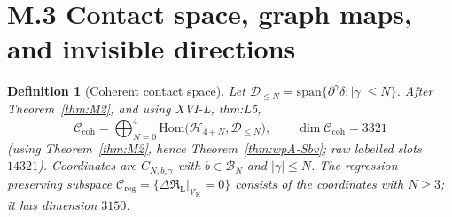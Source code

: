 \documentclass{article}
\newtheorem{definition}[proposition]{Definition}
\theoremstyle{remark}
\newcommand{\RL}{\mathfrak R_{\mathrm L}}
\newcommand{\Ccoh}{\mathcal C_{\mathrm{coh}}}
\newcommand{\Creg}{\mathcal C_{\mathrm{reg}}}
\begin{document}
\section{M.3 Contact space, graph maps, and invisible directions}
\label{sec:m3}

\begin{definition}[Coherent contact space]
\label{def:Ccoh}
Let $\mathcal D_{\le N}=\mathrm{span}\{\partial^\gamma\delta:|\gamma|\le N\}$.
After Theorem~\ref{thm:M2}, and using XVI-L, thm:L5,
\[
\Ccoh=\bigoplus_{N=0}^4\mathrm{Hom}\bigl(\mathcal H_{4+N},\mathcal D_{\le N}\bigr),\qquad\dim\Ccoh=3321
\]
(using Theorem~\ref{thm:M2}, hence Theorem~\ref{thm:wpA-Sbv}; raw labelled slots $14321$).
Coordinates are $C_{N,b,\gamma}$ with $b\in\mathcal B_N$ and $|\gamma|\le N$.
The regression-preserving subspace $\Creg=\{\Delta\RL|_{\mathcal V_{\mathrm K}}=0\}$ consists of the coordinates with $N\ge3$; it has dimension $3150$.
\end{definition}
\end{document}
